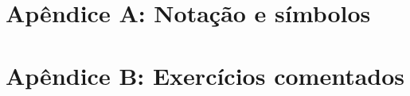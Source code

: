 \documentclass[12pt,a4paper,oneside]{book}
\begin{document}
\backmatter

\printglossary[type=\acronymtype,title={Lista de Siglas}]
\printglossary[title={Glossário}]

\printbibliography[title={Referências}]

\printindex

\appendix
\chapter{Apêndice A: Notação e símbolos}
\chapter{Apêndice B: Exercícios comentados}

\end{document}
